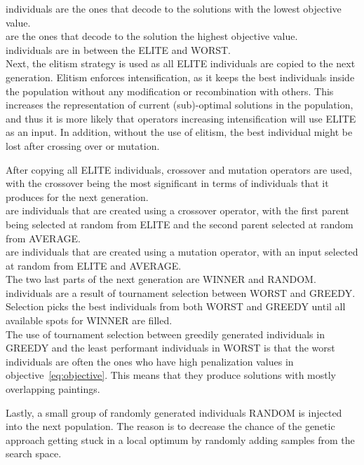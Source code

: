  individuals are the ones that decode to the solutions with the lowest objective value.\\

 are the ones that decode to the solution the highest objective value.\\

 individuals are in between the ELITE and WORST.\\

Next, the elitism strategy is used as all ELITE individuals are copied to the next generation.
Elitism enforces intensification, as it keeps the best individuals inside the population without any
modification or recombination with others.
This increases the representation of current (sub)-optimal solutions in the population, and thus it is more likely that operators increasing intensification will use ELITE as an input.
In addition, without the use of elitism, the best individual might be lost after crossing over or mutation.

After copying all ELITE individuals, crossover and mutation operators are used, with the crossover being
the most significant in terms of individuals that it produces for the next generation.\\

 are individuals that are created using a crossover operator, with the first parent being selected
at random from ELITE and the second parent selected at random from AVERAGE.\\

 are individuals that are created using a mutation operator,
with an input selected at random from ELITE and AVERAGE.\\

The two last parts of the next generation are WINNER and RANDOM.\\

 individuals are a result of tournament selection between WORST and GREEDY.
Selection picks the best individuals from both WORST and GREEDY until all available spots for WINNER are filled. \\

The use of tournament selection between greedily generated individuals in GREEDY and the least performant
individuals in WORST is that the worst individuals are often the ones who have high penalization
values in objective~\ref{eq:objective}.
This means that they produce solutions with mostly overlapping paintings.

Lastly, a small group of randomly generated individuals RANDOM is injected into the next population.
The reason is to decrease the chance of the genetic approach getting stuck in a local optimum
by randomly adding samples from the search space.

